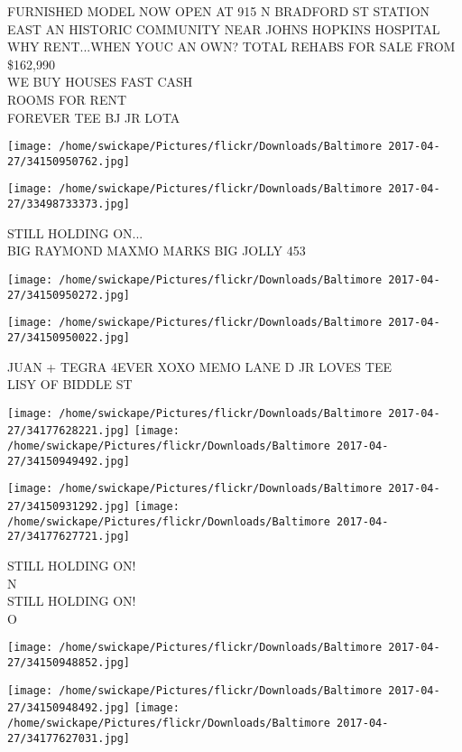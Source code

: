 \documentclass[10pt,letterpaper]{article}
\begin{document}
FURNISHED MODEL NOW OPEN AT 915 N BRADFORD ST STATION EAST AN HISTORIC COMMUNITY NEAR JOHNS HOPKINS HOSPITAL WHY RENT...WHEN YOUC AN OWN?  TOTAL REHABS FOR SALE FROM \$162,990\\
WE BUY HOUSES FAST CASH\\
ROOMS FOR RENT\\
FOREVER TEE BJ JR LOTA
\pagebreak

\texttt{[image: /home/swickape/Pictures/flickr/Downloads/Baltimore 2017-04-27/34150950762.jpg]}

\vspace{0.25in}
\texttt{[image: /home/swickape/Pictures/flickr/Downloads/Baltimore 2017-04-27/33498733373.jpg]}

STILL HOLDING ON...\\
BIG RAYMOND MAXMO MARKS BIG JOLLY 453
\pagebreak

\texttt{[image: /home/swickape/Pictures/flickr/Downloads/Baltimore 2017-04-27/34150950272.jpg]}

\vspace{0.25in}
\texttt{[image: /home/swickape/Pictures/flickr/Downloads/Baltimore 2017-04-27/34150950022.jpg]}

JUAN + TEGRA 4EVER XOXO MEMO LANE D JR LOVES TEE\\
LISY OF BIDDLE ST
\pagebreak

\texttt{[image: /home/swickape/Pictures/flickr/Downloads/Baltimore 2017-04-27/34177628221.jpg]}
\texttt{[image: /home/swickape/Pictures/flickr/Downloads/Baltimore 2017-04-27/34150949492.jpg]}

\texttt{[image: /home/swickape/Pictures/flickr/Downloads/Baltimore 2017-04-27/34150931292.jpg]}
\texttt{[image: /home/swickape/Pictures/flickr/Downloads/Baltimore 2017-04-27/34177627721.jpg]}

STILL HOLDING ON!\\
N\\
STILL HOLDING ON!\\
O
\pagebreak

\texttt{[image: /home/swickape/Pictures/flickr/Downloads/Baltimore 2017-04-27/34150948852.jpg]}

\vspace{0.25in}
\texttt{[image: /home/swickape/Pictures/flickr/Downloads/Baltimore 2017-04-27/34150948492.jpg]}
\texttt{[image: /home/swickape/Pictures/flickr/Downloads/Baltimore 2017-04-27/34177627031.jpg]}
\end{document}
